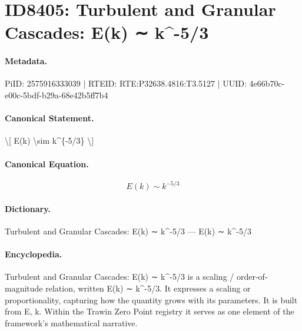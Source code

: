 \section*{ID8405: Turbulent and Granular Cascades: E(k) ∼ k\textasciicircum{}-5/3}
\paragraph{Metadata.}
PiID: 2575916333039 | RTEID: RTE:P32638.4816:T3.5127 | UUID: 4e66b70c-e00c-5bdf-b29a-68e42b5ff7b4

\paragraph{Canonical Statement.}
\textbackslash{}[ E(k) \textbackslash{}sim k\textasciicircum{}\{-5/3\} \textbackslash{}]

\paragraph{Canonical Equation.}
\[
E(k) \sim k^{-5/3}
\]

\paragraph{Dictionary.}
Turbulent and Granular Cascades: E(k) ∼ k\textasciicircum{}-5/3 — E(k) ∼ k\textasciicircum{}-5/3

\paragraph{Encyclopedia.}
Turbulent and Granular Cascades: E(k) ∼ k\textasciicircum{}-5/3 is a scaling / order-of-magnitude relation, written E(k) ∼ k\textasciicircum{}-5/3. It expresses a scaling or proportionality, capturing how the quantity grows with its parameters. It is built from E, k. Within the Trawin Zero Point registry it serves as one element of the framework's mathematical narrative.
